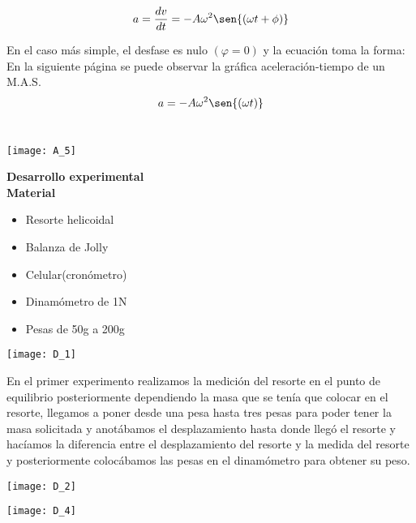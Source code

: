 \documentclass[11pt,a4paper]{article}
\newenvironment{Figuras}
  {\par\medskip\noindent\minipage{\linewidth}}
  {\endminipage\par\medskip}
\begin{document}
\begin{multicols}{2}
$$a=\frac{dv}{dt}=-A \omega^2 \sen{(\omega t + \phi )}$$

En el caso más simple, el desfase es nulo $(\varphi = 0)$ y la ecuación toma la forma: \\En la siguiente página se puede observar la gráfica aceleración-tiempo de un M.A.S.\\

$$a=-A \omega ^2\sen{(\omega t)}$$\\

\begin{Figuras}
	\centering
    \texttt{[image: A\_5]}
    \label{fig:mesh5}
\end{Figuras}

\textbf{{\normalsize Desarrollo experimental}}\\
\textbf{{\normalsize Material}}
\begin{itemize}
\item Resorte helicoidal
\item Balanza de Jolly
\item Celular(cronómetro)
\item Dinamómetro de 1N
\item Pesas de 50g a 200g \\
\end{itemize}

\begin{Figuras}
	\centering
    \texttt{[image: D\_1]}
    \label{fig:mesh6}
\end{Figuras}

En el primer experimento realizamos la medición del resorte en el punto de equilibrio posteriormente dependiendo la masa que se tenía que colocar en el resorte, llegamos a poner desde una pesa hasta tres pesas para poder tener la masa solicitada y anotábamos el desplazamiento hasta donde llegó el resorte y hacíamos la diferencia entre el desplazamiento del resorte y la medida del resorte y posteriormente colocábamos las pesas en el dinamómetro para obtener su peso.

\begin{Figuras}
	\centering
    \texttt{[image: D\_2]}
   
    \label{fig:mesh88}
\end{Figuras}


\begin{Figuras}
	\centering
    \texttt{[image: D\_4]}
    \label{fig:mesh7}
\end{Figuras}



\end{multicols}
\end{document}
